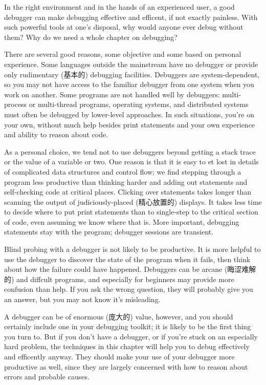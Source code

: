 In the right environment and in the hands of an experienced user, a good
debugger can make debugging effective and efficent, if not exactly
painless. With such powerful tools at one's disposal, why would anyone ever
debug without them? Why do we need a whole chapter on debugging?

There are several good reasons, some objective and some based on personal
experience. Some languages outside the mainstream have no debugger or
provide only rudimentary (基本的) debugging facilities. Debuggers are
system-dependent, so you may not have access to the familiar debugger from
one system when you work on another. Some programs are not handled well by
debuggers: multi-process or multi-thread programs, operating systems, and
distributed systems must often be debugged by lower-level approaches. In
such situations, you're on your own, without much help besides print
statements and your own experience and ability to reason about code.

As a personal choice, we tend not to use debuggers beyond getting a stack
trace or the value of a variable or two. One reason is that it is easy to
et lost in details of complicated data structures and control flow; we find
stepping through a program less productive than thinking harder and adding
out statements and self-checking code at critical places. Clicking over
statements takes longer than scanning the output of judiciously-placed
(精心放置的) displays. It takes less time to decide where to put print
statements than to single-step to the critical section of code, even
assuming we know where that is. More important, debugging statements stay
with the program; debugger sessions are transient.

Blind probing with a debugger is not likely to be productive. It is more
helpful to use the debugger to discover the state of the program when it
fails, then think about how the failure could have happened. Debuggers can
be arcane (晦涩难解的) and diffcult programs, and especially for beginners
may provide more confusion than help. If you ask the wrong question, they
will probably give you an answer, but you may not know it's misleading.

A debugger can be of enormous (庞大的) value, however, and you should
certainly include one in your debugging toolkit; it is likely to be the
first thing you turn to. But if you don't have a debugger, or if you're
stuck on an especially hard problem, the techniques in this chapter will
help you to debug effectively and efficently anyway. They should make your
use of your debugger more productive as well, since they are largely
concerned with how to reason about errors and probable causes.

